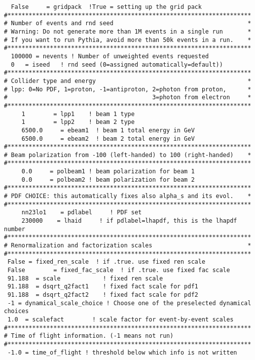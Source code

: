\begin{enumerate}
\begin{lstlisting}
  False     = gridpack  !True = setting up the grid pack
#*********************************************************************
# Number of events and rnd seed                                      *
# Warning: Do not generate more than 1M events in a single run       *
# If you want to run Pythia, avoid more than 50k events in a run.    *
#*********************************************************************
  100000 = nevents ! Number of unweighted events requested
  0   = iseed   ! rnd seed (0=assigned automatically=default))
#*********************************************************************
# Collider type and energy                                           *
# lpp: 0=No PDF, 1=proton, -1=antiproton, 2=photon from proton,      *
#                                         3=photon from electron     *
#*********************************************************************
     1        = lpp1    ! beam 1 type 
     1        = lpp2    ! beam 2 type
     6500.0     = ebeam1  ! beam 1 total energy in GeV
     6500.0     = ebeam2  ! beam 2 total energy in GeV
#*********************************************************************
# Beam polarization from -100 (left-handed) to 100 (right-handed)    *
#*********************************************************************
     0.0     = polbeam1 ! beam polarization for beam 1
     0.0     = polbeam2 ! beam polarization for beam 2
#*********************************************************************
# PDF CHOICE: this automatically fixes also alpha_s and its evol.    *
#*********************************************************************
     nn23lo1    = pdlabel     ! PDF set                                     
     230000    = lhaid     ! if pdlabel=lhapdf, this is the lhapdf number
#*********************************************************************
# Renormalization and factorization scales                           *
#*********************************************************************
 False = fixed_ren_scale  ! if .true. use fixed ren scale
 False        = fixed_fac_scale  ! if .true. use fixed fac scale
 91.188  = scale            ! fixed ren scale
 91.188  = dsqrt_q2fact1    ! fixed fact scale for pdf1
 91.188  = dsqrt_q2fact2    ! fixed fact scale for pdf2
 -1 = dynamical_scale_choice ! Choose one of the preselected dynamical choices
 1.0  = scalefact        ! scale factor for event-by-event scales
#*********************************************************************
# Time of flight information. (-1 means not run)
#*********************************************************************
 -1.0 = time_of_flight ! threshold below which info is not written

\end{lstlisting}
\end{enumerate}
